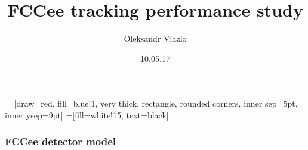 \documentclass[8pt]{beamer}
\newif\ifplacelogo %
\begin{document}
\newcommand{\yRefPosOne}{0.0}
\newcommand{\xRefPosOne}{0.0}
\newcommand{\yRefPosTwo}{0.0}
\newcommand{\xRefPosTwo}{0.0}
\newcommand{\yRefIncrementOne}{0.0}
\newcommand{\xRefIncrementOne}{0.0}
\newcommand{\yRefIncrementTwo}{0.0}
\newcommand{\xRefIncrementTwo}{0.0}

\graphicspath{{/afs/cern.ch/work/v/viazlo/analysis/trackingPerformance/perfPlots_vsMaterialBudget/}}



\title[FCCee tracking performance \hspace{17em}\insertframenumber/
\inserttotalframenumber]{FCCee tracking performance study}


	\author{Oleksandr Viazlo}
	\date{10.05.17\\}
  	\frame{\titlepage}

\placelogofalse

\newcommand{\channel}{enuqqbb}
\newcommand{\goodChannel}{$t\bar{t} \longrightarrow W^{+}bW^{-}\bar{b} \longrightarrow q\bar{q}be^{-}\bar{\nu_{e}}\bar{b} + e^{+}\nu_{e}bq\bar{q}\bar{b}$}
\newcommand{\myNodeOne}{\tikz[baseline,inner sep=1pt] \node[anchor=base]}
\newcommand{\myNodeTwo}{\tikz[baseline,inner sep=1pt] \node[anchor=base]}

 = [draw=red, fill=blue!1, very thick,
    rectangle, rounded corners, inner sep=5pt, inner ysep=9pt]
 =[fill=white!15, text=black]

\begin{frame}
\frametitle{FCCee detector model} 

\end{frame}
\end{document}
